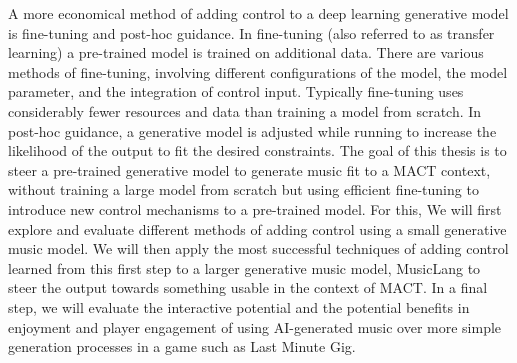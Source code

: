 A more economical method of adding control to a deep learning generative model is fine-tuning and post-hoc guidance. In fine-tuning (also referred to as transfer learning) a pre-trained model is trained on additional data. There are various methods of fine-tuning, involving different configurations of the model, the model parameter, and the integration of control input. Typically fine-tuning uses considerably fewer resources and data than training a model from scratch. In post-hoc guidance, a generative model is adjusted while running to increase the likelihood of the output to fit the desired constraints. The goal of this thesis is to steer a pre-trained generative model to generate music fit to a MACT context, without training a large model from scratch but using efficient fine-tuning to introduce new control mechanisms to a pre-trained model. For this, We will first explore and evaluate different methods of adding control using a small generative music model. We will then apply the most successful techniques of adding control learned from this first step to a larger generative music model, MusicLang to steer the output towards something usable in the context of MACT. In a final step, we will evaluate the interactive potential and the potential benefits in enjoyment and player engagement of using AI-generated music over more simple generation processes \cite{Chalkiadakis_2022} in a game such as Last Minute Gig.

